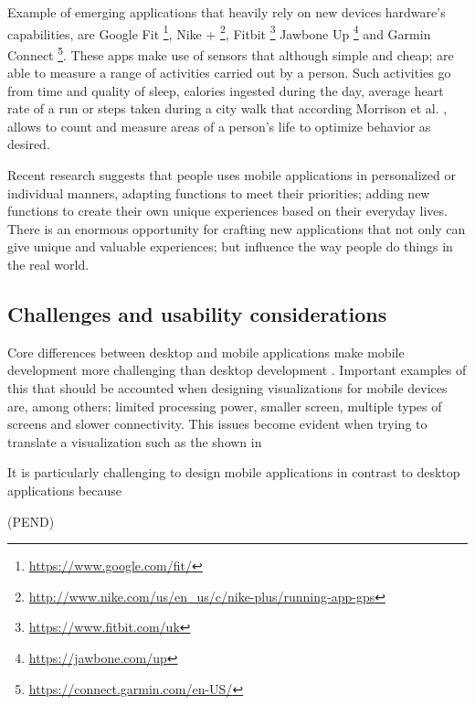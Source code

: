 Example of emerging applications that heavily rely on new devices hardware's capabilities, are Google Fit \footnote{\url{https://www.google.com/fit/}}, Nike + \footnote{\url{http://www.nike.com/us/en_us/c/nike-plus/running-app-gps}}, Fitbit \footnote{\url{https://www.fitbit.com/uk}} Jawbone Up \footnote{\url{https://jawbone.com/up}} and Garmin Connect \footnote{\url{https://connect.garmin.com/en-US/}}. These apps make use of sensors that although simple and cheap; are able to measure a range of activities carried out by a person. Such activities go from time and quality of sleep, calories ingested during the day, average heart rate of a run or steps taken during a city walk that according Morrison et al. \cite{Rooksby2014},  allows to count and measure areas of a person's life to optimize behavior as desired.

Recent research \cite{Barkhuus2011} suggests that people uses mobile applications in personalized or individual manners, adapting functions to meet their priorities; adding  new functions to create their own unique experiences based on their everyday lives. There is an enormous opportunity for crafting new applications that not only can give unique and valuable experiences; but influence the way people do things in the real world. 

\subsection{Challenges and usability considerations}

Core differences between desktop and mobile applications make mobile development more challenging than desktop development \cite{Chittaro2006}. Important examples of this that should be accounted when designing visualizations for mobile devices are, among others; limited processing power, smaller screen, multiple types of screens and slower connectivity. This issues become evident when trying to translate a visualization such as the shown in 

It is particularly challenging to design mobile applications in contrast to desktop applications because 

(PEND)




